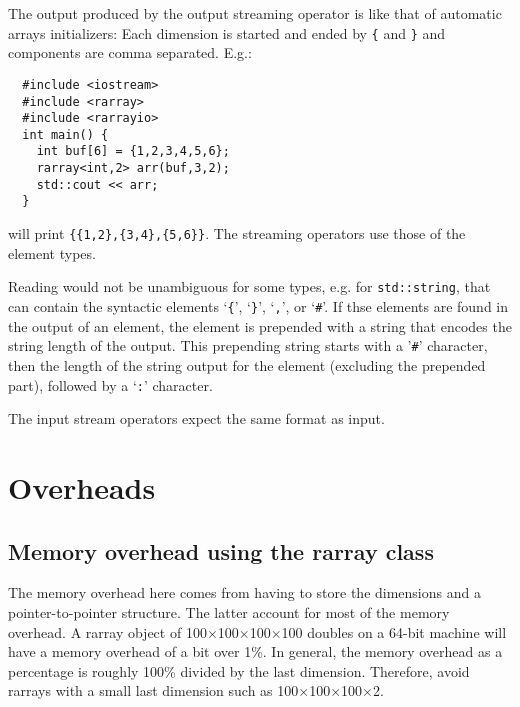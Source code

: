 \documentclass[11pt,twoside]{article}
\begin{document}
The output produced by the output streaming operator is like that of automatic arrays initializers: Each dimension is started and ended by \texttt{\{} and \texttt{\}} and components are comma separated. 
E.g.:\vspace{-9pt}
\begin{framed}\vspace{-18pt}%
\begin{verbatim}
  #include <iostream>
  #include <rarray>
  #include <rarrayio>
  int main() {
    int buf[6] = {1,2,3,4,5,6};
    rarray<int,2> arr(buf,3,2);
    std::cout << arr;
  }
\end{verbatim}%
\vspace{-12pt}
\end{framed}\vspace{-8pt}\noindent
will print \texttt{\{\{1,2\},\{3,4\},\{5,6\}\}}. The streaming operators use those of the element types. 

Reading would not be unambiguous for some types, e.g. for \texttt{std::string}, that can contain the syntactic elements `\texttt{\{}', `\texttt{\}}', `\texttt{,}', or `\texttt{\#}'.  If thse elements are found in the output of an element, the element is prepended with a string that encodes the string length of the output. This prepending string starts with a '\texttt\#' character, then the length of the string output for the element  (excluding the prepended part), followed by a `\texttt:' character.

The input stream operators expect the same format as input.

\section{Overheads}

\subsection{Memory overhead using the rarray class}

The memory overhead here comes from having to store the dimensions and a pointer-to-pointer structure.  The latter account for most of the memory overhead.   A rarray object of 100$\times$100$\times$100$\times$100  doubles on a 64-bit machine will have a memory overhead of a bit over 1\%. In general, the memory overhead as a percentage is roughly 100\% divided by the last dimension. Therefore, avoid rarrays with a small last dimension such as 100$\times$100$\times$100$\times$2.
\end{document}
